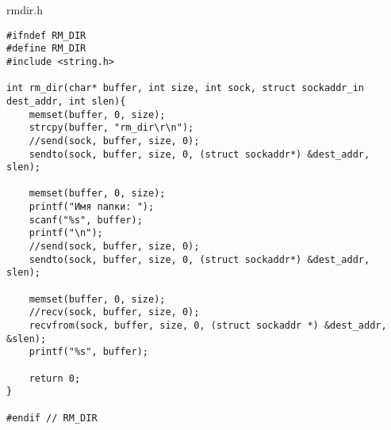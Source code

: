 \documentclass[12pt,a4paper]{report}
\begin{document}
rmdir.h
\begin{lstlisting}
#ifndef RM_DIR
#define RM_DIR
#include <string.h>

int rm_dir(char* buffer, int size, int sock, struct sockaddr_in dest_addr, int slen){
    memset(buffer, 0, size);
    strcpy(buffer, "rm_dir\r\n");
    //send(sock, buffer, size, 0);
	sendto(sock, buffer, size, 0, (struct sockaddr*) &dest_addr, slen);

    memset(buffer, 0, size);
    printf("Имя папки: ");
    scanf("%s", buffer);
    printf("\n");
    //send(sock, buffer, size, 0);
	sendto(sock, buffer, size, 0, (struct sockaddr*) &dest_addr, slen);

    memset(buffer, 0, size);
    //recv(sock, buffer, size, 0);
	recvfrom(sock, buffer, size, 0, (struct sockaddr *) &dest_addr, &slen);
    printf("%s", buffer);

    return 0;
}

#endif // RM_DIR
\end{lstlisting}
\end{document}
